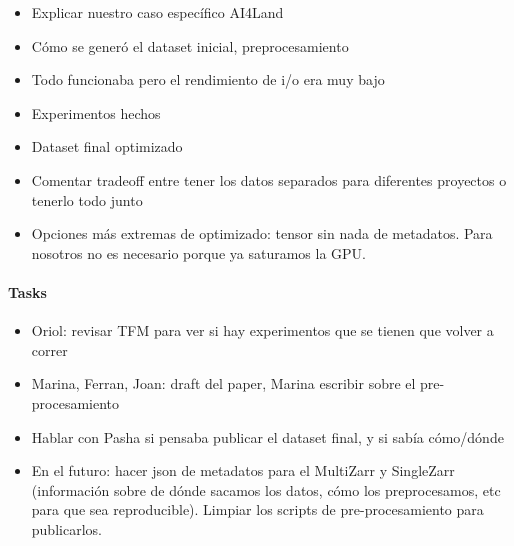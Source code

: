 \documentclass{article}
\begin{document}
\begin{itemize}
    \item Explicar nuestro caso específico AI4Land
    \item Cómo se generó el dataset inicial, preprocesamiento
    \item Todo funcionaba pero el rendimiento de i/o era muy bajo
    \item Experimentos hechos
    \item Dataset final optimizado
    \item Comentar tradeoff entre tener los datos separados para diferentes proyectos o tenerlo todo junto
    \item Opciones más extremas de optimizado: tensor sin nada de metadatos. Para nosotros no es necesario porque ya saturamos la GPU.
\end{itemize}

\paragraph{Tasks}

\begin{itemize}
    \item Oriol: revisar TFM para ver si hay experimentos que se tienen que volver a correr

    \item Marina, Ferran, Joan: draft del paper, Marina escribir sobre el pre-procesamiento

    \item Hablar con Pasha si pensaba publicar el dataset final, y si sabía cómo/dónde

    \item En el futuro: hacer json de metadatos para el MultiZarr y SingleZarr (información sobre de dónde sacamos los datos, cómo los preprocesamos, etc para que sea reproducible). Limpiar los scripts de pre-procesamiento para publicarlos.
\end{itemize}
\end{document}
